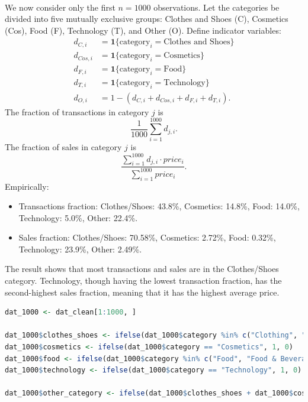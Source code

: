 \documentclass[a4paper,12pt]{article} %
\theoremstyle{nonitalic}
\newenvironment{solution}[1]
  {\renewcommand\theinnercustomsol{#1}\innercustomsol}
  {\endinnercustomsol}
\newcounter{solutionctr}[section]
\renewcommand{\thesolutionctr}{(\alph{solutionctr})}
\newenvironment{autosolution}
  {\stepcounter{solutionctr}\begin{solution}{\thesolutionctr}}
  {\end{solution}}
\begin{document}
\begin{autosolution}
    \

    We now consider only the first $n=1000$ observations. Let the categories be divided into five mutually exclusive groups: 
    Clothes and Shoes (C), Cosmetics (Cos), Food (F), Technology (T), and Other (O). Define indicator variables:
    \begin{align*}
        d_{C,i} &= \mathbf{1}\{\text{category}_i=\text{Clothes and Shoes}\} \\
        d_{Cos,i} &= \mathbf{1}\{\text{category}_i=\text{Cosmetics}\} \\
        d_{F,i} &= \mathbf{1}\{\text{category}_i=\text{Food}\} \\
        d_{T,i} &= \mathbf{1}\{\text{category}_i=\text{Technology}\} \\
        d_{O,i} &= 1 - (d_{C,i}+d_{Cos,i}+d_{F,i}+d_{T,i}).
    \end{align*}
    The fraction of transactions in category $j$ is
    \[
    \frac{1}{1000}\sum_{i=1}^{1000} d_{j,i}.
    \]
    The fraction of sales in category $j$ is
    \[
    \frac{\sum_{i=1}^{1000} d_{j,i} \cdot price_i}{\sum_{i=1}^{1000} price_i}.
    \]
    Empirically:
    \begin{itemize}
        \item Transactions fraction: Clothes/Shoes: 43.8\%, Cosmetics: 14.8\%, Food: 14.0\%, Technology: 5.0\%, Other: 22.4\%.
        \item Sales fraction: Clothes/Shoes: 70.58\%, Cosmetics: 2.72\%, Food: 0.32\%, Technology: 23.9\%, Other: 2.49\%.
    \end{itemize}
    The result shows that most transactions and sales are in the Clothes/Shoes category. 
    Technology, though having the lowest transaction fraction, has the second-highest sales fraction, 
    meaning that it has the highest average price.

    \begin{lstlisting}[language=R]
dat_1000 <- dat_clean[1:1000, ]

dat_1000$clothes_shoes <- ifelse(dat_1000$category %in% c("Clothing", "Shoes"), 1, 0)
dat_1000$cosmetics <- ifelse(dat_1000$category == "Cosmetics", 1, 0)
dat_1000$food <- ifelse(dat_1000$category %in% c("Food", "Food & Beverage"), 1, 0)
dat_1000$technology <- ifelse(dat_1000$category == "Technology", 1, 0)

dat_1000$other_category <- ifelse(dat_1000$clothes_shoes + dat_1000$cosmetics + dat_1000$food + dat_1000$technology == 0, 1, 0)


\end{lstlisting}
\end{autosolution}
\end{document}
